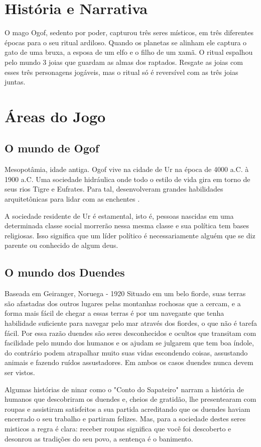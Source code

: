 
\section{História e Narrativa}

O mago Ogof, sedento por poder, capturou três seres místicos, em três diferentes épocas para o seu ritual ardiloso. Quando os planetas se alinham ele captura o gato de uma bruxa, a esposa de um elfo e o filho de um xamã. O ritual espalhou pelo mundo 3 joias que guardam as almas dos raptados. Resgate as joias com esses três personagens jogáveis, mas o ritual só é reversível com as três joias juntas.

\section{Áreas do Jogo}

\subsection{O mundo de Ogof}
Mesopotâmia, idade antiga. Ogof vive na cidade de Ur na época de 4000 a.C. à 1900 a.C. Uma sociedade hidráulica onde todo o estilo de vida gira em torno de seus rios Tigre e Eufrates. Para tal, desenvolveram grandes habilidades arquitetônicas para lidar com as enchentes .

A sociedade residente de Ur é estamental, isto é, pessoas nascidas em uma determinada classe social morrerão nessa mesma classe e sua política tem bases religiosas. Isso significa que um líder político é necessariamente alguém que se diz parente ou conhecido de algum deus.

\subsection{O mundo dos Duendes}
Baseada em Geiranger, Noruega - 1920
Situado em um belo fiorde, suas terras são afastadas dos outros lugares pelas montanhas rochosas que a cercam, e a forma mais fácil de chegar a essas terras é por um navegante que tenha habilidade suficiente para navegar pelo mar através dos
fiordes, o que não é tarefa fácil. Por essa razão duendes são seres desconhecidos e ocultos que transitam com facilidade pelo mundo dos humanos e os ajudam se julgarem que tem boa índole, do contrário podem atrapalhar muito suas vidas escondendo coisas, assustando animais e fazendo ruídos assustadores. Em ambos os casos duendes nunca devem ser vistos.

Algumas histórias de ninar como o "Conto do Sapateiro" narram a história de humanos que descobriram os duendes e, cheios de gratidão, lhe presentearam com roupas e assistiram satisfeitos a sua partida acreditando que os duendes haviam encerrado o seu trabalho e partiram felizes. Mas, para a sociedade destes seres misticos a regra é clara: receber roupas significa que você foi descoberto e desonrou as tradições do seu povo, a sentença é o banimento.

